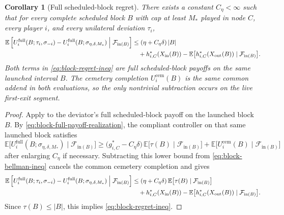\documentclass[12pt]{article}
\newtheorem{corollary}[theorem]{Corollary}
\theoremstyle{definition}
\newcommand{\E}{\mathbb{E}}
\newcommand{\1}{\mathbf{1}}
\newcommand{\cF}{\mathcal{F}}
\begin{document}
\begin{corollary}[Full scheduled-block regret]
\label{cor:block-regret}
There exists a constant $C_\eta<\infty$ such that for every complete scheduled
block $B$ with cap at least $M_*$ played in node $C$, every player $i$, and
every unilateral deviation $\tau_i$,
\begin{equation}
\label{eq:block-regret-ineq}
\begin{aligned}
\E\left[
U_i^{\mathrm{full}}(B;\tau_i,\sigma_{-i})
-
U_i^{\mathrm{full}}(B;\sigma_{\eta,\delta,M_*})
\Bigm|\cF_{\mathrm{in}(B)}
\right]
&\le
(\eta+C_\eta\delta)\,|B|
\\
&\quad+
h_{i,C}^*(X_{\mathrm{in}}(B))
-
\E\bigl[h_{i,C}^*(X_{\mathrm{out}}(B))\mid\cF_{\mathrm{in}(B)}\bigr].
\end{aligned}
\end{equation}
Both terms in \eqref{eq:block-regret-ineq} are full scheduled-block payoffs on
the same launched interval $B$. The cemetery completion
$U_i^{\mathrm{cem}}(B)$ is the same common addend in both evaluations, so the
only nontrivial subtraction occurs on the live first-exit segment.
\end{corollary}

\begin{proof}
Apply  to the deviator's full scheduled-block payoff on
the launched block $B$. By \eqref{eq:block-full-payoff-realization}, the compliant
controller on that same launched block satisfies
\[
\E\bigl[U_i^{\mathrm{full}}(B;\sigma_{\eta,\delta,M_*})\mid\cF_{\mathrm{in}(B)}\bigr]
\ge
\bigl(g_{i,C}^*-C_\eta\delta\bigr)\,
\E\bigl[\tau(B)\mid\cF_{\mathrm{in}(B)}\bigr]
+
\E\bigl[U_i^{\mathrm{cem}}(B)\mid\cF_{\mathrm{in}(B)}\bigr]
\]
after enlarging $C_\eta$ if necessary. Subtracting this lower bound from
\eqref{eq:block-bellman-ineq} cancels the common cemetery completion and gives
\begin{equation*}
\begin{aligned}
\E\left[
U_i^{\mathrm{full}}(B;\tau_i,\sigma_{-i})
-
U_i^{\mathrm{full}}(B;\sigma_{\eta,\delta,M_*})
\Bigm|\cF_{\mathrm{in}(B)}
\right]
&\le
(\eta+C_\eta\delta)\,
\E\bigl[\tau(B)\mid\cF_{\mathrm{in}(B)}\bigr]
\\
&\quad+
h_{i,C}^*(X_{\mathrm{in}}(B))
-
\E\bigl[h_{i,C}^*(X_{\mathrm{out}}(B))\mid\cF_{\mathrm{in}(B)}\bigr].
\end{aligned}
\end{equation*}
Since $\tau(B)\le |B|$, this implies \eqref{eq:block-regret-ineq}.
\end{proof}
\end{document}
